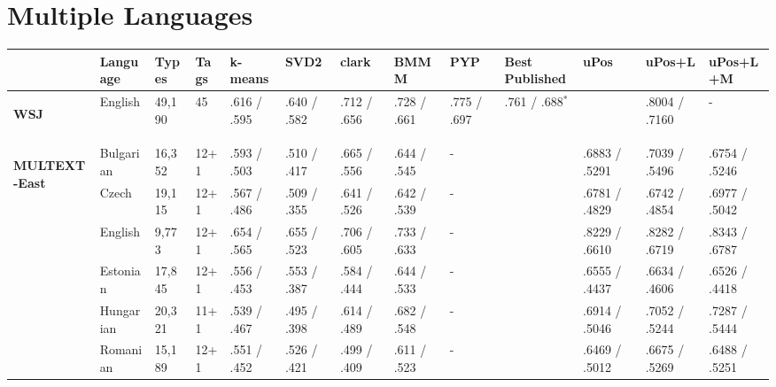 \section{Multiple Languages}
\begin{landscape}
\begin{table}[ht]
  \begin{tabular}{|l|l|l|l|p{1.5cm}|p{1.5cm}|p{1.5cm}|p{1.5cm}|p{1.5cm}|p{2cm}|p{2cm}|p{2cm}|p{2cm}|}
        \hline
        & Language   & Types   & Tags & k-means      & SVD2         & clark        & BMMM         & PYP    & Best Published & uPos           & uPos+L            & uPos+L+M     \\ \hline %
        \multirow{1}{*}{\begin{sideways}\textbf{WSJ}\end{sideways}} 
        & English    & 49,190  & 45   & .616 / .595   & .640 / .582   & .712 / .656   & .728 / .661   & .775 / .697 & .761 / .688$^*$ &               & .8004 / .7160 & -           \\
        & & & & & & & & & & & &\\ \hline
        \multirow{8}{*}{\begin{sideways}\textbf{MULTEXT-East}\end{sideways}} & 
        Bulgarian    & 16,352  & 12+1 & .593 / .503   & .510 / .417   & .665 / .556   & .644 / .545   & -         & & .6883 / .5291  & .7039 / .5496     & .6754 / .5246 \\
        & Czech      & 19,115  & 12+1 & .567 / .486   & .509 / .355   & .641 / .526   & .642 / .539   & -         & & .6781 / .4829  & .6742 / .4854     & .6977 / .5042 \\
        & English    & 9,773   & 12+1 & .654 / .565   & .655 / .523   & .706 / .605   & .733 / .633   & -         & & .8229 / .6610  & .8282 / .6719     & .8343 / .6787 \\
        & Estonian   & 17,845  & 12+1 & .556 / .453   & .553 / .387   & .584 / .444   & .644 / .533   & -         & & .6555 / .4437  & .6634 / .4606     & .6526 / .4418 \\
        & Hungarian  & 20,321  & 11+1 & .539 / .467   & .495 / .398   & .614 / .489   & .682 / .548   & -         & & .6914 / .5046  & .7052 / .5244     & .7287 / .5444 \\
        & Romanian   & 15,189  & 12+1 & .551 / .452   & .526 / .421   & .499 / .409   & .611 / .523   & -         & & .6469 / .5012  & .6675 / .5269     & .6488 / .5251 \\

\end{tabular}
\end{table}
\end{landscape}
